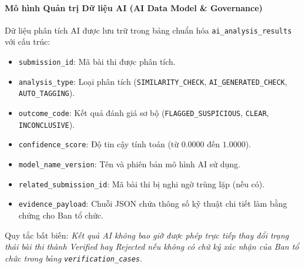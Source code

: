 \paragraph{Mô hình Quản trị Dữ liệu AI (AI Data Model \& Governance)}
Dữ liệu phân tích AI được lưu trữ trong bảng chuẩn hóa \texttt{ai\_analysis\_results} với cấu trúc:
\begin{itemize}
    \item \texttt{submission\_id}: Mã bài thi được phân tích.
    \item \texttt{analysis\_type}: Loại phân tích (\texttt{SIMILARITY\_CHECK}, \texttt{AI\_GENERATED\_CHECK}, \texttt{AUTO\_TAGGING}).
    \item \texttt{outcome\_code}: Kết quả đánh giá sơ bộ (\texttt{FLAGGED\_SUSPICIOUS}, \texttt{CLEAR}, \texttt{INCONCLUSIVE}).
    \item \texttt{confidence\_score}: Độ tin cậy tính toán (từ $0.0000$ đến $1.0000$).
    \item \texttt{model\_name\_version}: Tên và phiên bản mô hình AI sử dụng.
    \item \texttt{related\_submission\_id}: Mã bài thi bị nghi ngờ trùng lặp (nếu có).
    \item \texttt{evidence\_payload}: Chuỗi JSON chứa thông số kỹ thuật chi tiết làm bằng chứng cho Ban tổ chức.
\end{itemize}
Quy tắc bất biến: \textit{Kết quả AI không bao giờ được phép trực tiếp thay đổi trạng thái bài thi thành Verified hay Rejected nếu không có chữ ký xác nhận của Ban tổ chức trong bảng \texttt{verification\_cases}}.
